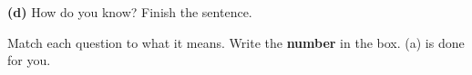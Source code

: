 \documentclass[12pt,a4paper]{article}
\newcommand{\qlines}[1]{\par\nobreak
  \noindent\begin{minipage}{\linewidth}\wlines{#1}\end{minipage}\par}
\begin{document}
\vspace{6pt}
\noindent\begin{minipage}{\textwidth}
\noindent\textbf{(d)} How do you know? Finish the sentence. \\[3pt]
\qlines{2}
\end{minipage}


\noindent\begin{minipage}{\textwidth}
\noindent Match each question to what it means. Write the \textbf{number} in the box.
(a) is done for you.


\end{minipage}
\end{document}
